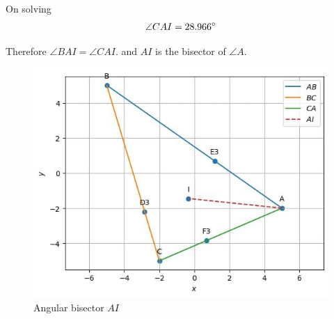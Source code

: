 \documentclass[11pt]{book}
\begin{document}
\begin{enumerate}[label=\thesection.\arabic*.,ref=\thesection.\theenumi]
\begin{enumerate}
\begin{align}
    \end{align}
    On solving 
    \begin{align}
        \angle CAI = 28.966\degree
    \end{align}
\end{enumerate}
Therefore $\angle BAI = \angle CAI.$ and $AI$ is the bisector of $\angle A$. 
\begin{figure}[H]
\includegraphics[width=\columnwidth]{figs/4000.jpg}
\caption{Angular bisector $AI$}
\label{fig:fig4}
\end{figure}


\end{enumerate}
\end{document}
